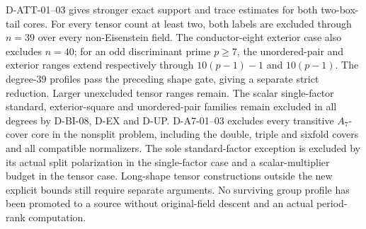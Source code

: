 \documentclass[11pt]{article}
\theoremstyle{remark}\newtheorem{remark}[theorem]{Remark}
\begin{document}
D-ATT-01--03 gives stronger exact support and trace estimates for both
two-box-tail cores. For every tensor count at least two, both labels
are excluded through $n=39$ over every non-Eisenstein field. The
conductor-eight exterior case also excludes $n=40$; for an odd
discriminant prime $p\ge7$, the unordered-pair and exterior ranges
extend respectively through $10(p-1)-1$ and $10(p-1)$.
The degree-$39$ profiles pass the preceding shape gate, giving a
separate strict reduction. Larger unexcluded tensor ranges remain.
The scalar single-factor
standard, exterior-square and unordered-pair families remain excluded
in all degrees by D-BI-08, D-EX and D-UP. D-A7-01--03 excludes
every transitive $A_7$-cover core in the nonsplit problem, including
the double, triple and sixfold covers and all compatible normalizers.
The sole standard-factor exception is excluded by its actual split
polarization in the single-factor case and a scalar-multiplier budget
in the tensor case. Long-shape tensor constructions outside the
new explicit bounds still require separate arguments. No surviving group profile has been promoted to a source
without original-field descent and an actual period-rank computation.
\end{document}
